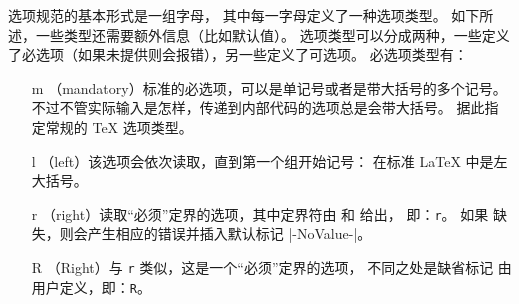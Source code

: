 \documentclass{l3doc}
\begin{document}
%
选项规范的基本形式是一组字母，
其中每一字母定义了一种选项类型。
如下所述，一些类型还需要额外信息（比如默认值）。
选项类型可以分成两种，一些定义了必选项（如果未提供则会报错），另一些定义了可选项。
必选项类型有：
\begin{itemize}[font=\ttfamily]
\item[m] （mandatory）标准的必选项，可以是单记号或者是带大括号的多个记号。
不过不管实际输入是怎样，传递到内部代码的选项总是会带大括号。
 据此指定常规的 \TeX{} 选项类型。
\item[l] （left）该选项会依次读取，直到第一个组开始记号：
在标准 \LaTeX{} 中是左大括号。
\item[r] （right）读取“必须”定界的选项，其中定界符由  和  给出，
即：\texttt{r}。
如果  缺失，则会产生相应的错误并插入默认标记 |-NoValue-|。
\item[R] （Right）与 \texttt{r} 类似，这是一个“必须”定界的选项，
不同之处是缺省标记  由用户定义，即：\texttt{R}。

\end{itemize}
\end{document}
